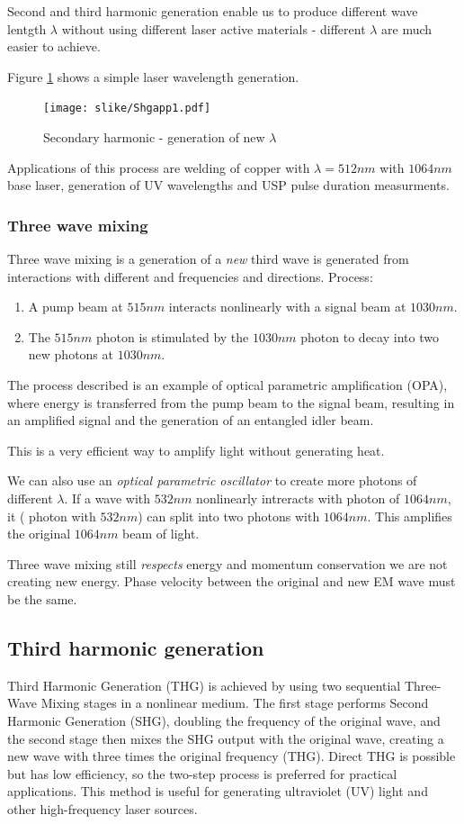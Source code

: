 Second and third harmonic generation enable us to produce different wave lentgth $\lambda$ without using
different laser active materials - different $\lambda$ are much easier to achieve.

Figure \ref{fig:shgapp1} shows a simple laser wavelength generation. 
\begin{figure}[h!]
    \centering
    \texttt{[image: slike/Shgapp1.pdf]}
    \caption{Secondary harmonic - generation of new $\lambda$}
    \label{fig:shgapp1}
\end{figure}

Applications of this process are welding of copper with $\lambda = 512 nm$ with $1064nm$ base laser, generation of UV wavelengths and USP pulse duration measurments.

\subsubsection{Three wave mixing}
Three wave mixing is a generation of a \textit{new} third wave is generated from interactions with 
different and frequencies and directions.
Process: 
\begin{enumerate}
    \item A pump beam at $515 nm$ interacts nonlinearly with a signal beam at $1030 nm$.
    \item The $515 nm$ photon is stimulated by the $1030 nm$ photon to decay into two new photons at $1030 nm$.
\end{enumerate}

The process described is an example of optical parametric amplification (OPA),
where energy is transferred from the pump beam to the signal beam, 
resulting in an amplified signal and the generation of an entangled idler beam.

This is a very efficient way to amplify light without generating heat. 

We can also use an \textit{optical parametric oscillator} to create more photons of different $\lambda$. 
If a wave with $532 nm$ nonlinearly intreracts with photon of $1064 nm$, it ( photon with $532nm$) can split into two 
photons with $1064nm$. This amplifies the original $1064nm$ beam of light. 

Three wave mixing still \textit{respects} energy and momentum conservation \pd we are not creating new energy. 
Phase velocity between the original and new EM wave must be the same. 

\subsection{Third harmonic generation}
Third Harmonic Generation (THG) is achieved by using two sequential Three-Wave Mixing  stages in a nonlinear medium.
The first stage performs Second Harmonic Generation (SHG), doubling the frequency of the original wave, and the second
stage then mixes the SHG output with the original wave, creating a new wave with three times the original frequency (THG).
Direct THG is possible but has low efficiency, so the two-step process is preferred for practical applications. 
This method is useful for generating ultraviolet (UV) light and other high-frequency laser sources.

